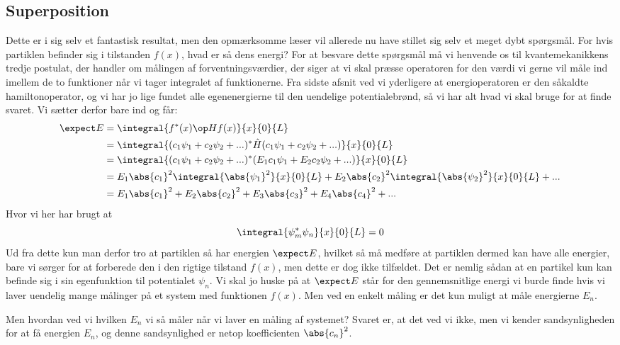 \subsection{Superposition}
Dette er i sig selv et fantastisk resultat, men den opmærksomme læser vil allerede nu have stillet sig selv et meget dybt spørgsmål. For hvis partiklen befinder sig i tilstanden $f(x)$, hvad er så dens energi? For at besvare dette spørgsmål må vi henvende os til kvantemekanikkens tredje postulat, der handler om målingen af forventningsværdier, der siger at vi skal præsse operatoren for den værdi vi gerne vil måle ind imellem de to funktioner når vi tager integralet af funktionerne. Fra sidste afsnit ved vi yderligere at energioperatoren er den såkaldte hamiltonoperator, og vi har jo lige fundet alle egenenergierne til den uendelige potentialebrønd, så vi har alt hvad vi skal bruge for at finde svaret. Vi sætter derfor bare ind og får:
\begin{align*}
    \expect E&=\integral{f^*(x)\op H f(x)}{x}{0}{L}\\
    &=\integral{(c_1\psi_1+c_2\psi_2+...)^{*}\hat{H}(c_1\psi_1+c_2\psi_2+...)}{x}{0}{L}\\
    &=\integral{(c_1\psi_1+c_2\psi_2+...)^{*}(E_1c_1\psi_1+E_2c_2\psi_2+...)}{x}{0}{L}\\
    &=E_1\abs{c_1}^2\integral{\abs{\psi_1}^2}{x}{0}{L}+E_2\abs{c_2}^2\integral{\abs{\psi_2}^2}{x}{0}{L}+...\\
    &=E_1\abs{c_1}^2+E_2\abs{c_2}^2+E_3\abs{c_3}^2+E_4\abs{c_4}^2+...
\end{align*}
Hvor vi her har brugt at 
$$ \integral{\psi_{m}^{*}\psi_n}{x}{0}{L}=0$$
Ud fra dette kun man derfor tro at partiklen så har energien $\expect E$, hvilket så må medføre at partiklen dermed kan have alle energier, bare vi sørger for at forberede den i den rigtige tilstand $f(x)$, men dette er dog ikke tilfældet.
Det er nemlig sådan at en partikel kun kan befinde sig i sin egenfunktion til potentialet $\psi_n$. Vi skal jo huske på at $\expect E$ står for den gennemsnitlige energi vi burde finde hvis vi laver uendelig mange målinger på et system med funktionen $f(x)$. Men ved en enkelt måling er det kun muligt at måle energierne $E_n$.

Men hvordan ved vi hvilken $E_n$ vi så måler når vi laver en måling af systemet? Svaret er, at det ved vi ikke, men vi kender sandsynligheden for at få energien $E_n$, og denne sandsynlighed er netop koefficienten $\abs{c_n}^2$. 

